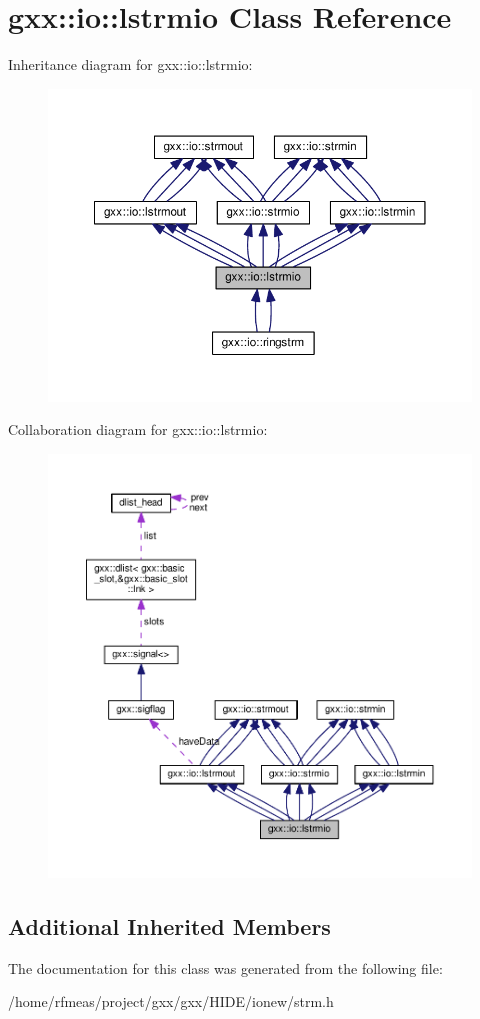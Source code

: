 \hypertarget{classgxx_1_1io_1_1lstrmio}{}\section{gxx\+:\+:io\+:\+:lstrmio Class Reference}
\label{classgxx_1_1io_1_1lstrmio}


Inheritance diagram for gxx\+:\+:io\+:\+:lstrmio\+:
\nopagebreak
\begin{figure}[H]
\begin{center}
\leavevmode
\includegraphics[width=350pt]{classgxx_1_1io_1_1lstrmio__inherit__graph}
\end{center}
\end{figure}


Collaboration diagram for gxx\+:\+:io\+:\+:lstrmio\+:
\nopagebreak
\begin{figure}[H]
\begin{center}
\leavevmode
\includegraphics[width=350pt]{classgxx_1_1io_1_1lstrmio__coll__graph}
\end{center}
\end{figure}
\subsection*{Additional Inherited Members}


The documentation for this class was generated from the following file\+:\begin{DoxyCompactItemize}
\item 
/home/rfmeas/project/gxx/gxx/\+H\+I\+D\+E/ionew/strm.\+h\end{DoxyCompactItemize}
